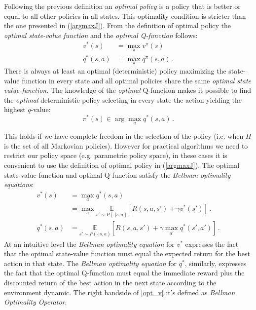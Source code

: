 Following the previous definition an \textit{optimal policy} is a policy that is better or equal to all other policies in all states. This optimality condition is stricter than the one presented in (\ref{argmaxJ}).
From the definition of optimal policy the \textit{optimal state-value function} and the \textit{optimal Q-function} follows:
\begin{align}
	v^{*}(s) &= \max_\pi v^\pi(s) \\
	q^{*}(s,a) &= \max_\pi q^\pi(s,a) \, .
\end{align}
There is always at least an optimal (deterministic) policy maximizing the state-value function in every state \citep{Puterman:1994:MDP:528623} and all optimal policies share the same \textit{optimal state value-function}. 
The knowledge of the \textit{optimal} Q-function makes it possible to find the \textit{optimal} deterministic policy selecting in every state the action yielding the highest $q$-value: 
\begin{equation}
	\pi^*(s) \in \arg \max_a q^{*}(s,a) \, .
\end{equation}

This holds if we have complete freedom in the selection of the policy (i.e. when $\Pi$ is the set of all Markovian policies). However for practical algorithms we need to restrict our policy space (e.g. parametric policy space), in these cases it is convenient to use the definition of optimal policy in (\ref{argmaxJ}). 
\newline
The optimal state-value function and optimal Q-function satisfy the \textit{Bellman optimality equations}:
\begin{align}
	v^*(s) &= \max_a q^*(s,a) \label{opt_v} \\
		   &= \max_a \underset{s' \sim P(\cdot | s,a)}{
			\mathbb{E}} \left[ R(s,a,s') + \gamma v^*(s') \right] \, . \\			
	q^*(s,a) &= \underset{s' \sim P(\cdot | s,a)}{
			\mathbb{E}} \left[ R(s,a,s') + \gamma \max_{a'} q^*(s',a') \right] \label{opt_q} \, .
\end{align}
At an intuitive level the \textit{Bellman optimality equation} for $v^*$ expresses the fact that the optimal state-value function must equal the expected return for the best action in that state. The \textit{Bellman optimality equation} for $q^*$, similarly, expresses the fact that the optimal Q-function must equal the immediate reward plus the discounted return of the best action in the next state according to the environment dynamic. \newline
The right handside of \cref{opt_v} it's defined as \textit{Bellman Optimality Operator}.

